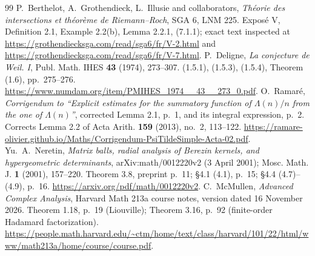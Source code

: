 \begin{thebibliography}{99}
 P.~Berthelot, A.~Grothendieck, L.~Illusie and collaborators, \emph{Th\'eorie des intersections et th\'eor\`eme de Riemann--Roch}, SGA 6, LNM 225. Expos\'e V, Definition 2.1, Example 2.2(b), Lemma 2.2.1, (7.1.1); exact text inspected at \url{https://grothendiecksga.com/read/sga6/fr/V-2.html} and \url{https://grothendiecksga.com/read/sga6/fr/V-7.html}.
 P.~Deligne, \emph{La conjecture de Weil. I}, Publ. Math. IHES \textbf{43} (1974), 273--307. (1.5.1), (1.5.3), (1.5.4), Theorem (1.6), pp.~275--276. \url{https://www.numdam.org/item/PMIHES_1974__43__273_0.pdf}.
 O.~Ramar\'e, \emph{Corrigendum to ``Explicit estimates for the summatory function of $\Lambda(n)/n$ from the one of $\Lambda(n)$''}, corrected Lemma 2.1, p.~1, and its integral expression, p.~2. Corrects Lemma 2.2 of Acta Arith. \textbf{159} (2013), no.~2, 113--122. \url{https://ramare-olivier.github.io/Maths/Corrigendum-PsiTildeSimple-Acta-02.pdf}.
 Yu.~A.~Neretin, \emph{Matrix balls, radial analysis of Berezin kernels, and hypergeometric determinants}, arXiv:math/0012220v2 (3 April 2001); Mosc. Math. J. \textbf{1} (2001), 157--220. Theorem 3.8, preprint p.~11; \S4.1 (4.1), p.~15; \S4.4 (4.7)--(4.9), p.~16. \url{https://arxiv.org/pdf/math/0012220v2}.
 C.~McMullen, \emph{Advanced Complex Analysis}, Harvard Math 213a course notes, version dated 16 November 2026. Theorem 1.18, p.~19 (Liouville); Theorem 3.16, p.~92 (finite-order Hadamard factorization). \url{https://people.math.harvard.edu/~ctm/home/text/class/harvard/101/22/html/www/math213a/home/course/course.pdf}.
\end{thebibliography}

